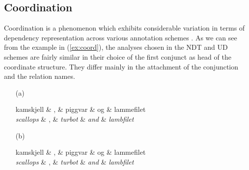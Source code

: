 \documentclass[11pt,a4paper]{article}
\let\w=\emph
\begin{document}
\subsection{Coordination}
Coordination is a phenomenon which exhibits considerable variation in terms
of dependency representation across various annotation schemes \cite{Pop:Mar:Ste:13}.
As we can see from the example in (\ref{ex:coord}), the analyses
chosen in the NDT and UD schemes are fairly similar in their choice of
the first conjunct as head of the coordinate structure. They differ
mainly in the attachment of the conjunction and the relation names.
\begin{example}
\label{ex:coord}
\begin{itemize}
\item[(a)]
    \begin{dependency}[arc edge, text only label, theme=simple]
        \begin{deptext}[column sep=.2cm]
          kamskjell \& , \& piggvar \& og \& lammefilet \\
          \w{scallops} \& , \& \w{turbot} \& \w{and} \& \w{lambfilet}\\
        \end{deptext}
    \end{dependency}
\item[(b)]
    \begin{dependency}[arc edge, text only label, theme=simple]
        \begin{deptext}[column sep=.2cm]
          kamskjell \& , \& piggvar \& og \& lammefilet \\
          \w{scallops} \& , \& \w{turbot} \& \w{and} \& \w{lambfilet}\\
        \end{deptext}
    \end{dependency}
\end{itemize}
\end{example}
\end{document}
